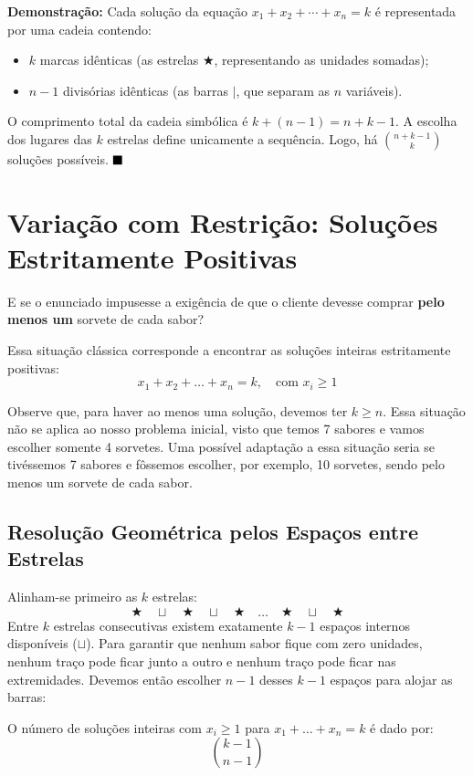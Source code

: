 \documentclass[12pt,a4paper]{report}
\begin{document}
	\textbf{Demonstração:} 
	Cada solução da equação $x_1 + x_2 + \cdots + x_n = k$ é representada por uma cadeia contendo:
	\begin{itemize}
		\item $k$ marcas idênticas (as estrelas $\bigstar$, representando as unidades somadas);
		\item $n - 1$ divisórias idênticas (as barras $\mid$, que separam as $n$ variáveis).
	\end{itemize}
	O comprimento total da cadeia simbólica é $k + (n - 1) = n + k - 1$. A escolha dos lugares das $k$ estrelas define unicamente a sequência. Logo, há $\binom{n+k-1}{k}$ soluções possíveis. $\hfill \blacksquare$
	
	\section{Variação com Restrição: Soluções Estritamente Positivas}
	
	E se o enunciado impusesse a exigência de que o cliente devesse comprar \textbf{pelo menos um} sorvete de cada sabor? 
	
	Essa situação clássica corresponde a encontrar as soluções inteiras estritamente positivas:
	$$x_1 + x_2 + \dots + x_n = k, \quad \text{com } x_i \geqslant 1$$
	
	Observe que, para haver ao menos uma solução, devemos ter $k \geqslant n$. Essa situação não se aplica ao nosso problema inicial, visto que temos 7 sabores e vamos escolher somente 4 sorvetes. Uma possível adaptação a essa situação seria se tivéssemos 7 sabores e fôssemos escolher, por exemplo, 10 sorvetes, sendo pelo menos um sorvete de cada sabor.
	
	\subsection{Resolução Geométrica pelos Espaços entre Estrelas}
	Alinham-se primeiro as $k$ estrelas:
	$$\bigstar \quad \sqcup \quad \bigstar \quad \sqcup \quad \bigstar \quad \dots \quad \bigstar \quad \sqcup \quad \bigstar$$
	Entre $k$ estrelas consecutivas existem exatamente $k - 1$ espaços internos disponíveis ($\sqcup$). Para garantir que nenhum sabor fique com zero unidades, nenhum traço pode ficar junto a outro e nenhum traço pode ficar nas extremidades. Devemos então escolher $n - 1$ desses $k - 1$ espaços para alojar as barras:
	
	\begin{destaque}
		\label{dest:solucoes_positivas}
		O número de soluções inteiras com $x_i \geqslant 1$ para $x_1 + \dots + x_n = k$ é dado por:
		$$\binom{k - 1}{n - 1}$$
	\end{destaque}
	
\end{document}

